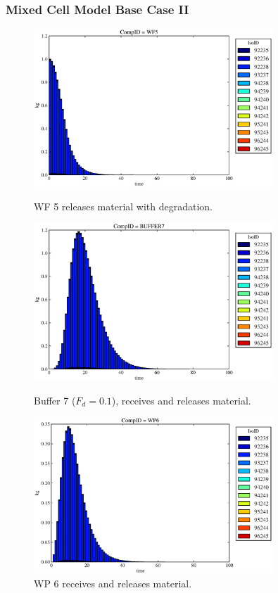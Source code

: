 \begin{frame}[ctb!]
  \frametitle{Mixed Cell Model Base Case II}
  \begin{figure}
\begin{minipage}[b]{0.45\linewidth}

  \includegraphics[width=0.8\textwidth]{./images/mcIII1.eps}
  \caption[MCI WF Contaminants.]{
    WF 5 releases material with degradation. 
    }
  \label{fig:mcIIIwf5}
  
  \includegraphics[width=0.8\textwidth]{./images/mcIII3.eps}
  \caption[Case MCI Buffer Contaminants]{
    Buffer 7 ($F_d=0.1$), receives and releases material.
    }
  \label{fig:mcIIIbuff}

\end{minipage}
\hspace{0.05\linewidth}
\begin{minipage}[b]{0.45\linewidth}
  \includegraphics[width=0.8\textwidth]{./images/mcIII2.eps}
  \caption[Case MCI WP Contaminants.]{ 
    WP 6 receives and releases material. 
    }
  \label{fig:mcIIIwp6}


\end{minipage}
\end{figure}
\end{frame}
